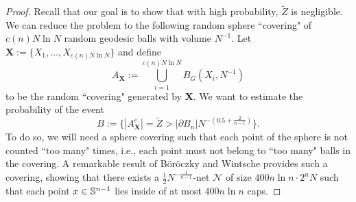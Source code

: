 \begin{proof}
	Recall that our goal is to show that with high probability, $ \tilde{Z} $ is negligible. We can reduce the problem to the following  random sphere ``covering" of $ c(n)N\ln N$ random geodesic balls with volume $ N^{-1}.$	Let $ \mathbf{X} := \{X_1,\ldots, X_{c(n)N\ln N}\} $ and define 
	\[
	A_{\mathbf X} :=\bigcup_{i=1}^{c(n)N\ln N} B_{G}(X_i,N^{-1})
	\]
	to be the random ``covering" generated by $\mathbf{X}$. We want to estimate the probability of the  event 
	\[
	B :=\{ |A^c_{\mathbf X}| = \tilde Z > |\partial B_n|N^{-(0.5+\frac{2}{n-1})}\}.
	\]
	To do so, we will need a sphere covering such that each point of the sphere is not counted ``too many" times, i.e., each point must not belong to ``too many" balls in the covering. A remarkable result of B\"or\"oczky and Wintsche \cite[Theorem 1.1]{boroczky2003covering} provides such a covering,  showing that there exists a $ \frac{1}{2}N^{-\frac{1}{n-1}}$-net  
	$\mathcal{N}$ of size $400 n\ln n\cdot 2^n N$ %
	such that each point $x\in\mathbb{S}^{n-1}$ lies inside of at most $ 400 n\ln n$ caps. %
	

\end{proof}

